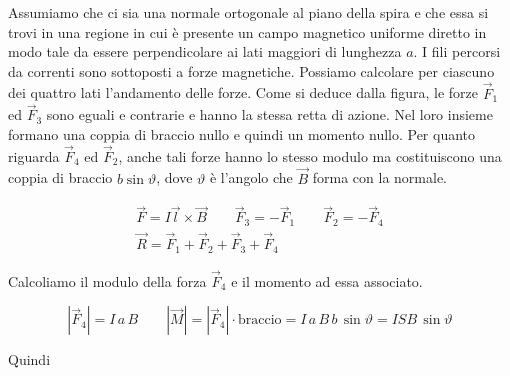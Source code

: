 \begin{figure}[htpb]
\end{figure}
\FloatBarrier

Assumiamo che ci sia una normale ortogonale al piano della spira e che essa si trovi in una regione in cui è presente un campo magnetico uniforme diretto in modo tale da essere perpendicolare ai lati maggiori di lunghezza $a$.
I fili percorsi da correnti sono sottoposti a forze magnetiche. Possiamo calcolare per ciascuno dei quattro lati l'andamento delle forze. Come si deduce dalla figura, le forze $\vec{F}_1$ ed $\vec{F}_3$ sono eguali e contrarie e hanno la stessa retta di azione. Nel loro insieme formano una coppia di braccio nullo e quindi un momento nullo. Per quanto riguarda $\vec{F}_4$ ed $\vec{F}_2$, anche tali forze hanno lo stesso modulo ma costituiscono una coppia di braccio $b\sin \vartheta$, dove $ \vartheta$ è l'angolo che $\vec{B}$ forma con la normale.

\begin{gather*}
	\vec{F} =I\vec{l} \times \vec{B} \qquad \vec{F}_3=-\vec{F}_1 \qquad \vec{F}_2 = -\vec{F}_4 \\
	\vec{R} = \vec{F}_1+\vec{F}_2+\vec{F}_3+\vec{F}_4
\end{gather*}

Calcoliamo il modulo della forza $ \vec{F}_4$ e il momento ad essa associato.

\[
	|\vec{F}_4 |=I\,a\,B \qquad |\vec{M} |=|\vec{F}_4 |\cdot \text{braccio} = I\,a\,B\,b\,\sin \vartheta = ISB\,\sin \vartheta
\]

Quindi

